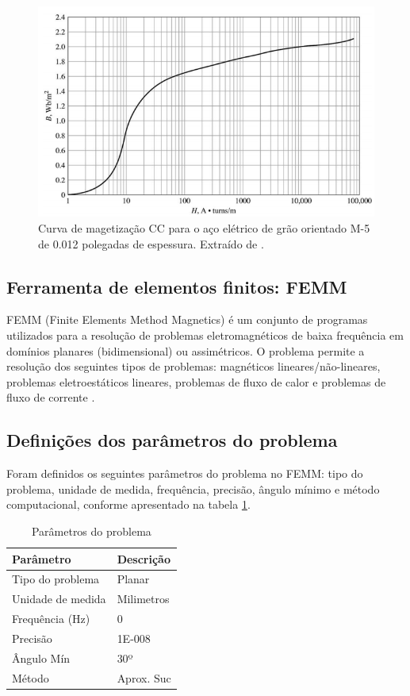\begin{figure}[H]
\centering
\includegraphics[scale=0.5]{img/curv_magn.png}
\caption[Curva de magetização CC para o aço elétrico de grão orientado M-5 de 0.012 polegadas de espessura]{Curva de magetização CC para o aço elétrico de grão orientado M-5 de 0.012 polegadas de espessura. Extraído de \cite{Fitzgerald2008}.}
\label{cc}
\end{figure}

\subsection{Ferramenta de elementos finitos: FEMM}
FEMM (Finite Elements Method Magnetics) é um conjunto de programas utilizados para a resolução de problemas eletromagnéticos de baixa frequência em domínios planares (bidimensional) ou assimétricos. O problema permite a resolução dos seguintes tipos de problemas: magnéticos lineares/não-lineares, problemas eletroestáticos lineares, problemas de fluxo de calor e problemas de fluxo de corrente \cite{Meeker2014}.

\subsection{Definições dos parâmetros do problema}
Foram definidos os seguintes parâmetros do problema no FEMM: tipo do problema, unidade de medida, frequência, precisão, ângulo mínimo e método computacional, conforme apresentado na tabela \ref{probdef}.
\begin{table}[H]
\centering
\caption{Parâmetros do problema}
\label{probdef}
\begin{tabular}{ll}
\hline
\textbf{Parâmetro} & \textbf{Descrição} \\ \hline
Tipo do problema   & Planar             \\
Unidade de medida  & Milimetros         \\
Frequência (Hz)    & 0                  \\
Precisão           & 1E-008             \\
Ângulo Mín         & 30º                \\
Método             & Aprox. Suc         \\ \hline
\end{tabular}
\end{table}


